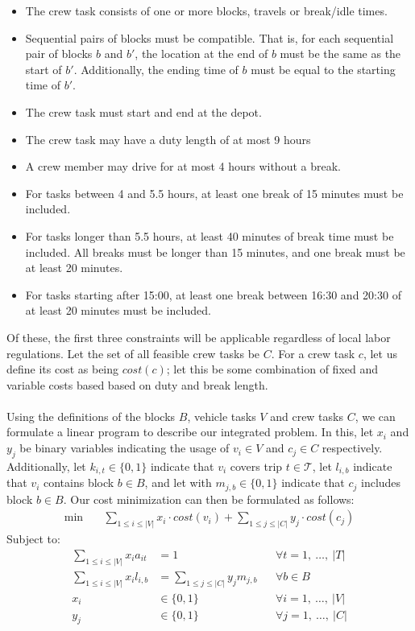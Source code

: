 \documentclass[]{article}
\begin{document}
\begin{itemize}
  \item The crew task consists of one or more blocks, travels or break/idle times.
  \item Sequential pairs of blocks must be compatible. That is, for each sequential pair of blocks $b$ and $b'$, the location at the end of $b$ must be the same as the start of $b'$. Additionally, the ending time of $b$ must be equal to the starting time of $b'$. 
  \item The crew task must start and end at the depot.
  \item The crew task may have a duty length of at most 9 hours 
  \item A crew member may drive for at most 4 hours without a break.
  \item For tasks between 4 and 5.5 hours, at least one break of 15 minutes must be included. 
  \item For tasks longer than 5.5 hours, at least 40 minutes of break time must be included. All breaks must be longer than 15 minutes, and one break must be at least 20 minutes.
  \item For tasks starting after 15:00, at least one break between 16:30 and 20:30 of at least 20 minutes must be included. 
\end{itemize}
Of these, the first three constraints will be applicable regardless of local labor regulations. Let the set of all feasible crew tasks be $C$. For a crew task $c$, let us define its cost as being $cost(c)$; let this be some combination of fixed and variable costs based based on duty and break length. \\\\
Using the definitions of the blocks $B$, vehicle tasks $V$ and crew tasks $C$, we can formulate a linear program to describe our integrated problem. In this, let $x_i$ and $y_j$ be binary variables indicating the usage of $v_i \in V$ and $c_j \in C$ respectively. Additionally, let $k_{i,t} \in \{ 0, 1 \}$ indicate that $v_i$ covers trip $t \in \mathcal{T}$, let $l_{i,b}$ indicate that $v_i$ contains block $b \in B$, and let with $m_{j,b} \in \{ 0, 1 \} $ indicate that $c_j$ includes block $b \in B$. Our cost minimization can then be formulated as follows:
\begin{align}
\min \quad
& \sum_{1 \leq i \leq |V|} x_{i} \cdot cost(v_i) + \sum_{1 \leq j \leq |C|} y_{j} \cdot cost(c_j)  
\end{align}
Subject to:
\begin{align}
\sum_{1 \leq i \leq |V|} x_{i}a_{it} &= 1 && \forall t = 1,\:\dots,\:|T| \label{form:all-trips-covered} \\
\sum_{1 \leq i \leq |V|}x_i l_{i,b}  &= \sum_{1 \leq j \leq |C|}y_j m_{j,b}  && \forall b \in B \label{form:all-blocks-covered} \\
x_{i} &\in \{ 0, 1 \} && \forall i = 1,\:\dots,\:|V| \\
y_{j} &\in \{ 0, 1 \} && \forall j = 1,\:\dots,\:|C|
\end{align}
\end{document}
